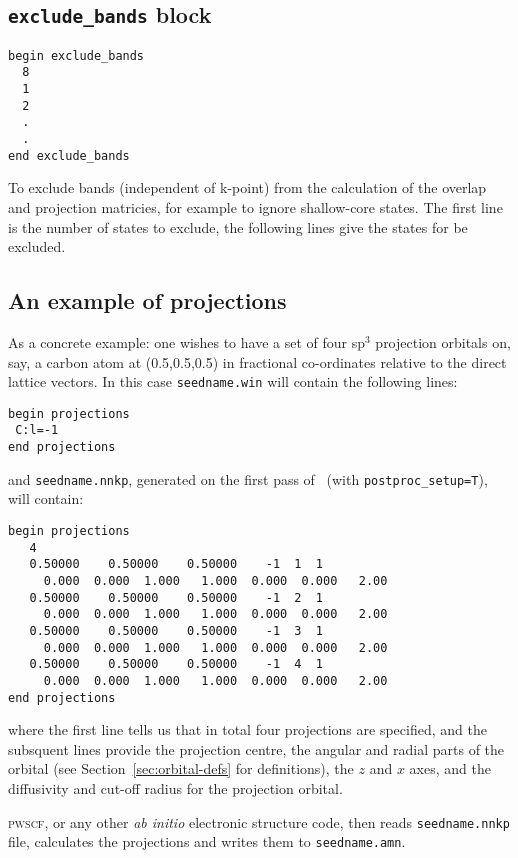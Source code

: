 \subsection{{\tt exclude\_bands} block}
\begin{verbatim}
begin exclude_bands 
  8 
  1 
  2 
  .
  .
end exclude_bands
\end{verbatim}
To exclude bands (independent of k-point) from the calculation of the 
overlap and projection matricies, for example to ignore shallow-core states.
The first line is the number of states to exclude, the following lines give
the states for be excluded.


\subsection{An example of projections}\label{sec:proj_example}

As a concrete example: one wishes to have a set of four sp$^3$ projection
orbitals on, say, a carbon atom at (0.5,0.5,0.5) in fractional
co-ordinates relative to the direct lattice vectors. In this case
\verb#seedname.win# will contain the following lines:

\begin{verbatim}
begin projections
 C:l=-1
end projections
\end{verbatim}

and \verb#seedname.nnkp#, generated on the first pass of
\wannier\ (with \verb#postproc_setup=T#), will contain: 

\begin{verbatim}
begin projections
   4
   0.50000    0.50000    0.50000    -1  1  1
     0.000  0.000  1.000   1.000  0.000  0.000   2.00 
   0.50000    0.50000    0.50000    -1  2  1
     0.000  0.000  1.000   1.000  0.000  0.000   2.00 
   0.50000    0.50000    0.50000    -1  3  1
     0.000  0.000  1.000   1.000  0.000  0.000   2.00 
   0.50000    0.50000    0.50000    -1  4  1
     0.000  0.000  1.000   1.000  0.000  0.000   2.00 
end projections
\end{verbatim}

where the first line tells us that in total four projections are
specified, and the subsquent lines provide the projection centre, the
angular and radial parts of the orbital (see
Section~\ref{sec:orbital-defs} for definitions), the $z$ and $x$ axes,
and the diffusivity and cut-off radius for the projection orbital.

\textsc{pwscf}, or any other \textit{ab initio} electronic structure
code, then reads \verb#seedname.nnkp# file, calculates the projections
and writes them to \verb#seedname.amn#. 




